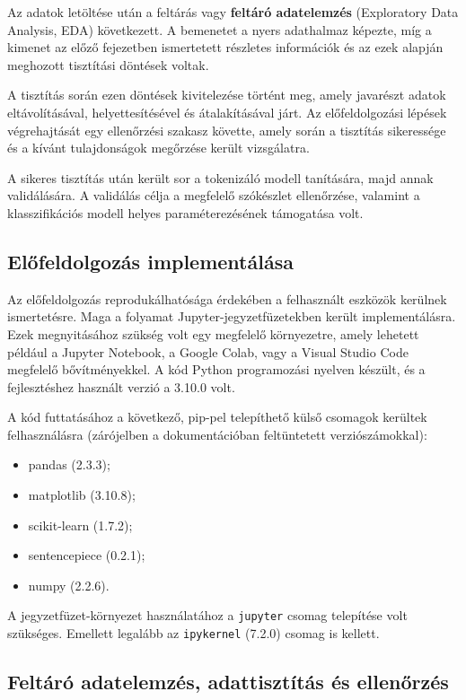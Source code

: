 Az adatok letöltése után a feltárás vagy \textbf{feltáró adatelemzés} (Exploratory Data Analysis, EDA) következett. A bemenetet a nyers adathalmaz képezte, 
míg a kimenet az előző fejezetben ismertetett részletes információk és az ezek alapján meghozott tisztítási döntések voltak. 

A tisztítás során ezen döntések kivitelezése történt meg, amely javarészt adatok eltávolításával, helyettesítésével és átalakításával járt. 
Az előfeldolgozási lépések végrehajtását egy ellenőrzési szakasz követte, amely során a tisztítás sikeressége és a kívánt tulajdonságok megőrzése került vizsgálatra.

A sikeres tisztítás után került sor a tokenizáló modell tanítására, majd annak validálására. 
A validálás célja a megfelelő szókészlet ellenőrzése, valamint a klasszifikációs modell helyes paraméterezésének támogatása volt.

 \subsection{Előfeldolgozás implementálása}

 Az előfeldolgozás reprodukálhatósága érdekében a felhasznált eszközök kerülnek ismertetésre. Maga a folyamat Jupyter-jegyzetfüzetekben került implementálásra. 
 Ezek megnyitásához szükség volt egy megfelelő környezetre, amely lehetett például a Jupyter Notebook, a Google Colab, vagy a Visual Studio Code megfelelő bővítményekkel. 
 A kód Python programozási nyelven készült, és a fejlesztéshez használt verzió a 3.10.0 volt.
 
 A kód futtatásához a következő, pip-pel telepíthető külső csomagok kerültek felhasználásra (zárójelben a dokumentációban feltüntetett verziószámokkal):
 
 \begin{itemize}
     \item pandas (2.3.3);
     \item matplotlib (3.10.8);
     \item scikit-learn (1.7.2);
     \item sentencepiece (0.2.1);
     \item numpy (2.2.6).
 \end{itemize}
 
A jegyzetfüzet-környezet használatához a \texttt{jupyter} csomag telepítése volt szükséges.
Emellett legalább az \texttt{ipykernel} (7.2.0) csomag is kellett.

\subsection{Feltáró adatelemzés, adattisztítás és ellenőrzés}

